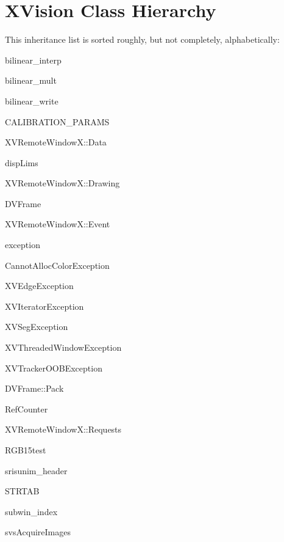 \section{XVision Class Hierarchy}
This inheritance list is sorted roughly, but not completely, alphabetically:\begin{CompactList}
\item {}
\item bilinear\_\-interp\item bilinear\_\-mult\item bilinear\_\-write\item CALIBRATION\_\-PARAMS\item XVRemote\-Window\-X::Data\item disp\-Lims\item XVRemote\-Window\-X::Drawing\item DVFrame\item XVRemote\-Window\-X::Event\item exception\begin{CompactList}
\item {}
\begin{CompactList}
\item Cannot\-Alloc\-Color\-Exception\item XVEdge\-Exception\item {}
\item XVIterator\-Exception\item {}
\item XVSeg\-Exception\item XVThreaded\-Window\-Exception\item {}
\item XVTracker\-OOBException\end{CompactList}
\end{CompactList}
\item DVFrame::Pack\item Ref\-Counter\item XVRemote\-Window\-X::Requests\item RGB15test\item srisunim\_\-header\item STRTAB\item subwin\_\-index\item svs\-Acquire\-Images\begin{CompactList}

\end{CompactList}
\end{CompactList}
